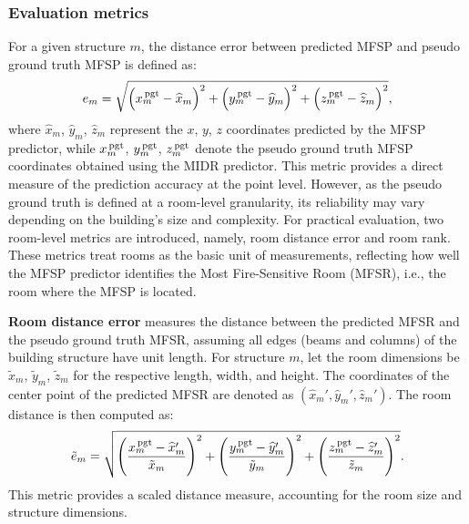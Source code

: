 \subsubsection{Evaluation metrics}
\label{sec:7.2.1}

For a given structure $m$, the distance error between predicted MFSP and pseudo ground truth MFSP is defined as: 
\begin{equation}
    e_{m} = \sqrt{\left( x_{m}^{\, \text{pgt}} - \widehat{x}_{m} \right)^2 + \left( y_{m}^{\, \text{pgt}} - \widehat{y}_{m} \right)^2 + \left( z_{m}^{\, \text{pgt}} - \widehat{z}_{m} \right)^2},
\end{equation}
where $\widehat{x}_{m}$, $\widehat{y}_{m}$, $\widehat{z}_{m}$ represent the $x$, $y$, $z$ coordinates predicted by the MFSP predictor, while $x_{m}^{\, \text{pgt}}$, $y_{m}^{\, \text{pgt}}$, $z_{m}^{\, \text{pgt}}$ denote the pseudo ground truth MFSP coordinates obtained using the MIDR predictor. This metric provides a direct measure of the prediction accuracy at the point level. However, as the pseudo ground truth is defined at a room-level granularity, its reliability may vary depending on the building's size and complexity. For practical evaluation, two room-level metrics are introduced, namely, room distance error and room rank. These metrics treat rooms as the basic unit of measurements, reflecting how well the MFSP predictor identifies the Most Fire-Sensitive Room (MFSR), i.e., the room where the MFSP is located.

{\bf{Room distance error}} measures the distance between the predicted MFSR and the pseudo ground truth MFSR, assuming all edges (beams and columns) of the building structure have unit length. For structure $m$, let the room dimensions be $\tilde{x}_{m}$, $\tilde{y}_{m}$, $\tilde{z}_{m}$ for the respective length, width, and height. The coordinates of the center point of the predicted MFSR are denoted as $\left( \widehat{x}_{m}', \widehat{y}_{m}', \widehat{z}_{m}'\right)$. The room distance is then computed as:
\begin{equation}
    \tilde{e}_{m} = \sqrt{\left( \frac{x_{m}^{\, \text{pgt}} - \widehat{x}_{m}'}{\tilde{x}_{m}} \right)^2 + \left( \frac{y_{m}^{\, \text{pgt}} - \widehat{y}_{m}'}{\tilde{y}_{m}} \right)^2 + \left( \frac{z_{m}^{\, \text{pgt}} - \widehat{z}_{m}'}{\tilde{z}_{m}} \right)^2}.
\end{equation}
This metric provides a scaled distance measure, accounting for the room size and structure dimensions.

